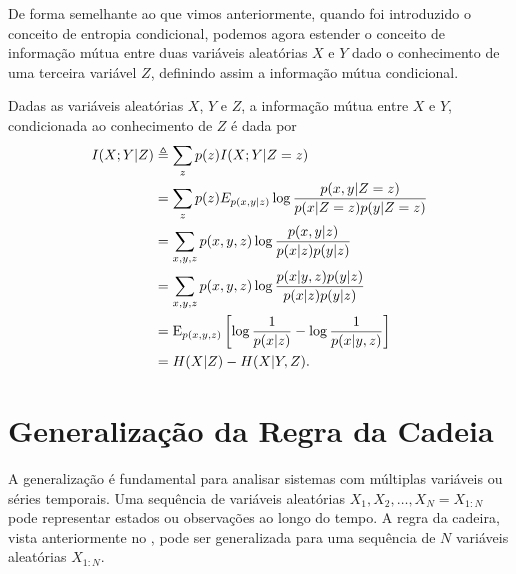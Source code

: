 De forma semelhante ao que vimos anteriormente, quando foi introduzido
o conceito de entropia condicional, podemos agora estender o conceito
de informação mútua entre duas variáveis aleatórias $X$ e $Y$ dado o 
conhecimento de uma terceira variável $Z$, definindo assim a informação 
mútua condicional.
\begin{definition}\label{def:infmutcond}
Dadas as variáveis aleatórias $X$, $Y$ e $Z$, a informação mútua entre
$X$ e $Y$, condicionada ao conhecimento de $Z$ é dada por
\begin{subequations}\label{eq:mutinfcond}
{
\allowdisplaybreaks
\begin{align}
I(X;Y|Z) &\triangleq \sum_z p(z) I(X;Y|Z=z) \\
         &= \sum_z p(z) E_{p(x,y|z)} \log \frac{p(x,y|Z=z)}{p(x|Z=z) p(y|Z=z)} \\
         &= \sum_{x,y,z} p(x,y,z) \log \frac{p(x,y|z)}{p(x|z)p(y|z)} \\
	 &= \sum_{x,y,z} p(x,y,z) \log \frac{p(x|y,z)p(y|z)}{p(x|z)p(y|z)} \\
	 &= \E_{p(x,y,z)} \left[ \log \frac{1}{p(x|z)} - \log \frac{1}{p(x|y,z)} \right] \\
         &= H(X|Z) - H(X|Y,Z) .
\end{align}
}
\end{subequations}
\end{definition}





\section{Generalização da Regra da Cadeia}\label{sec-genchainrule}

A generalização é fundamental para analisar sistemas com múltiplas variáveis ou séries temporais.
Uma sequência de variáveis aleatórias $X_1, X_2, \ldots, X_N = X_{1:N}$ pode representar estados ou observações ao longo do tempo.
A regra da cadeira, vista anteriormente no ,
pode ser generalizada para uma sequência de $N$ variáveis aleatórias $X_{1:N}$.


